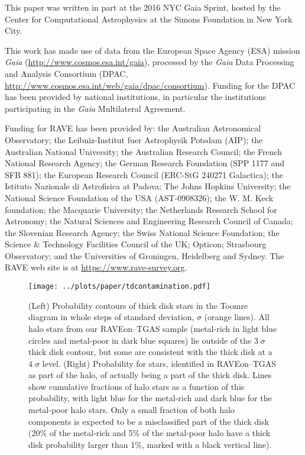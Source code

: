 \documentclass[apj, twocolappendix, numberedappendix, appendixfloats]{emulateapj}
\begin{document}
This paper was written in part at the 2016 NYC Gaia Sprint, hosted by the Center for Computational Astrophysics at the Simons Foundation in New York City.

This work has made use of data from the European Space Agency (ESA) mission {\it Gaia} (\url{http://www.cosmos.esa.int/gaia}), processed by the {\it Gaia} Data Processing and Analysis Consortium (DPAC, \url{http://www.cosmos.esa.int/web/gaia/dpac/consortium}). Funding for the DPAC has been provided by national institutions, in particular the institutions participating in the {\it Gaia} Multilateral Agreement.

Funding for RAVE has been provided by: the Australian Astronomical Observatory; the Leibniz-Institut fuer Astrophysik Potsdam (AIP); the Australian National University; the Australian Research Council; the French National Research Agency; the German Research Foundation (SPP 1177 and SFB 881); the European Research Council (ERC-StG 240271 Galactica); the Istituto Nazionale di Astrofisica at Padova; The Johns Hopkins University; the National Science Foundation of the USA (AST-0908326); the W. M. Keck foundation; the Macquarie University; the Netherlands Research School for Astronomy; the Natural Sciences and Engineering Research Council of Canada; the Slovenian Research Agency; the Swiss National Science Foundation; the Science \& Technology Facilities Council of the UK; Opticon; Strasbourg Observatory; and the Universities of Groningen, Heidelberg and Sydney.
The RAVE web site is at \url{https://www.rave-survey.org}.

\begin{figure*}
\begin{center}
\texttt{[image: ../plots/paper/tdcontamination.pdf]}
\caption{(Left) Probability contours of thick disk stars in the Toomre diagram in whole steps of standard deviation, $\sigma$ (orange lines).
All halo stars from our RAVEon--TGAS sample (metal-rich in light blue circles and metal-poor in dark blue squares) lie outside of the $3\;\sigma$ thick disk contour, but some are consistent with the thick disk at a $4\;\sigma$ level.
(Right) Probability for stars, identified in RAVEon--TGAS as part of the halo, of actually being a part of the thick disk.
Lines show cumulative fractions of halo stars as a function of this probability, with light blue for the metal-rich and dark blue for the metal-poor halo stars.
Only a small fraction of both halo components is expected to be a misclassified part of the thick disk (20\% of the metal-rich and 5\% of the metal-poor halo have a thick disk probability larger than 1\%, marked with a black vertical line).}
\label{fig:tdcont}
\end{center}
\end{figure*}
\end{document}
